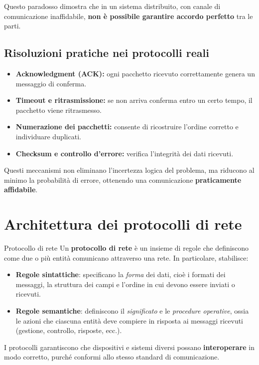 \documentclass[a4paper,12pt]{report}
\begin{document}
\begin{notebox}{}
Questo paradosso dimostra che in un sistema distribuito, con canale di comunicazione inaffidabile, \textbf{non è possibile garantire accordo perfetto} tra le parti.
\end{notebox}

\subsection*{Risoluzioni pratiche nei protocolli reali}

\begin{itemize}
    \item \textbf{Acknowledgment (ACK):} ogni pacchetto ricevuto correttamente genera un messaggio di conferma.  
    \item \textbf{Timeout e ritrasmissione:} se non arriva conferma entro un certo tempo, il pacchetto viene ritrasmesso.  
    \item \textbf{Numerazione dei pacchetti:} consente di ricostruire l’ordine corretto e individuare duplicati.  
    \item \textbf{Checksum e controllo d’errore:} verifica l’integrità dei dati ricevuti.  
\end{itemize}

\begin{notebox}{}
Questi meccanismi non eliminano l’incertezza logica del problema, ma riducono al minimo la probabilità di errore, ottenendo una comunicazione \textbf{praticamente affidabile}.
\end{notebox}



\newpage
\section{Architettura dei protocolli di rete}

\begin{defbox}{Protocollo di rete}
Un \textbf{protocollo di rete} è un insieme di regole che definiscono come due o più entità comunicano attraverso una rete.  
In particolare, stabilisce:
\begin{itemize}
    \item \textbf{Regole sintattiche}: specificano la \textit{forma} dei dati, cioè i formati dei messaggi, la struttura dei campi e l’ordine in cui devono essere inviati o ricevuti.  
    \item \textbf{Regole semantiche}: definiscono il \textit{significato} e le \textit{procedure operative}, ossia le azioni che ciascuna entità deve compiere in risposta ai messaggi ricevuti (gestione, controllo, risposte, ecc.).  

\end{itemize}

I protocolli garantiscono che dispositivi e sistemi diversi possano \textbf{interoperare} in modo corretto, purché conformi allo stesso standard di comunicazione.
\end{defbox}
\end{document}
